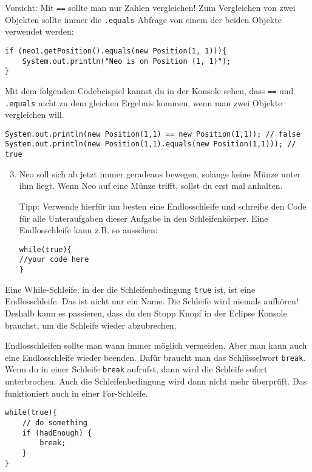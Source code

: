 \begin{Infobox}[\lstinline{==} und \lstinline{.equals()}]
	Vorsicht: Mit \lstinline{==} sollte man nur Zahlen vergleichen! 
	Zum Vergleichen von zwei Objekten sollte immer die \lstinline{.equals} Abfrage von einem der beiden Objekte verwendet werden:

	\begin{lstlisting}[numbers=none]
if (neo1.getPosition().equals(new Position(1, 1))){
	System.out.println("Neo is on Position (1, 1)");
}
	\end{lstlisting}

	Mit dem folgenden Codebeispiel kannst du in der Konsole sehen, dass \lstinline{==} und \lstinline{.equals} nicht zu dem gleichen Ergebnis kommen, wenn man zwei Objekte vergleichen will.

	\begin{lstlisting}[numbers=none]
System.out.println(new Position(1,1) == new Position(1,1)); // false
System.out.println(new Position(1,1).equals(new Position(1,1))); // true
	\end{lstlisting}

\end{Infobox}


\begin{enumerate}\setcounter{enumi}{2}
	\item
		Neo soll sich ab jetzt immer geradeaus bewegen, solange keine Münze unter ihm liegt.
		Wenn Neo auf eine Münze trifft, sollst du erst mal anhalten.

		Tipp: Verwende hierfür am besten eine Endlosschleife und schreibe den Code für alle Unteraufgaben dieser Aufgabe in den Schleifenkörper.
		Eine Endlosschleife kann z.B. so aussehen:
	\begin{lstlisting}
while(true){
//your code here
}
	\end{lstlisting}
\end{enumerate}


\begin{Infobox}
	Eine While-Schleife, in der die Schleifenbedingung \lstinline{true} ist, ist eine Endlosschleife.
	Das ist nicht nur ein Name.
	Die Schleife wird niemals aufhören!
	Deshalb kann es passieren, dass du den Stopp Knopf in der Eclipse Konsole brauchst, um die Schleife wieder abzubrechen.

	Endlosschleifen sollte man wann immer möglich vermeiden.
	Aber man kann auch eine Endlosschleife wieder beenden.
	Dafür braucht man das Schlüsselwort \lstinline{break}.
	Wenn du in einer Schleife \lstinline{break} aufrufst, dann wird die Schleife sofort unterbrochen.
	Auch die Schleifenbedingung wird dann nicht mehr überprüft.
	Das funktioniert auch in einer For-Schleife.
	
	\begin{lstlisting}[numbers=none]
while(true){
    // do something
    if (hadEnough) {
        break;
    }
}
	\end{lstlisting}

\end{Infobox}



